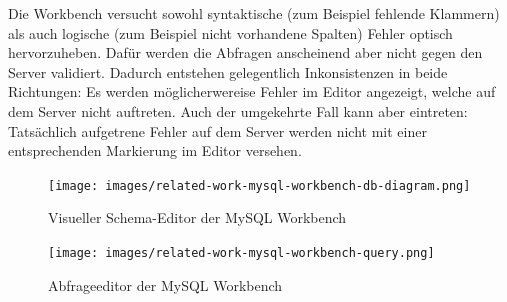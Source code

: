 Die Workbench versucht sowohl syntaktische (zum Beispiel fehlende Klammern) als auch logische (zum Beispiel nicht vorhandene Spalten) Fehler optisch hervorzuheben. Dafür werden die Abfragen anscheinend aber nicht gegen den Server validiert. Dadurch entstehen gelegentlich Inkonsistenzen in beide Richtungen: Es werden möglicherwereise Fehler im Editor angezeigt, welche auf dem Server nicht auftreten. Auch der umgekehrte Fall kann aber eintreten: Tatsächlich aufgetrene Fehler auf dem Server werden nicht mit einer entsprechenden Markierung im Editor versehen.

\begin{figure}[p]
  \centering \texttt{[image: images/related-work-mysql-workbench-db-diagram.png]}
  \caption{Visueller Schema-Editor der MySQL Workbench}
  \label{fig:mysql-workbench-schema-diagram}
\end{figure}

\begin{figure}[p]
  \centering \texttt{[image: images/related-work-mysql-workbench-query.png]}
  \caption{Abfrageeditor der MySQL Workbench}
  \label{fig:mysql-workbench-query}
\end{figure}

